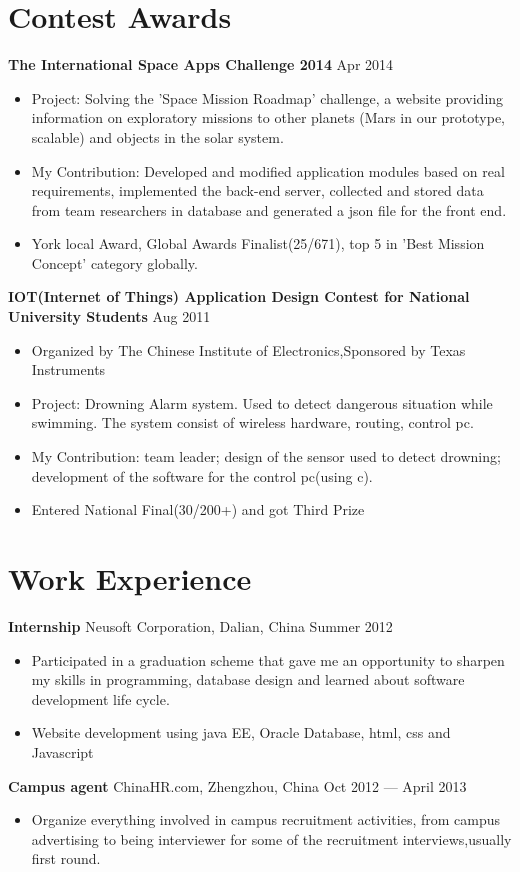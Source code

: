 \documentclass[margin]{res}
\begin{document}
\begin{resume}
\section{Contest Awards}   
{\bf The International Space Apps Challenge 2014}  \hfill Apr 2014
\begin{itemize} \itemsep -2pt
  \item Project: Solving the 'Space Mission Roadmap' challenge, a website
  providing information on exploratory missions to other planets (Mars in our
  prototype, scalable) and objects in the solar system.
  \item My Contribution: Developed and modified application modules based on
  real requirements, implemented the back-end server, collected and
  stored data from team researchers in database and generated a json file for
  the front end.
  \item York local Award, Global Awards Finalist(25/671), top 5 in 'Best Mission
  Concept' category globally.
\end{itemize}
{\bf IOT(Internet of Things) Application Design Contest for
National University Students} \hspace{\fill} Aug 2011\\  
\begin{itemize} \itemsep -2pt
  \item Organized by The
Chinese Institute of Electronics,Sponsored by Texas Instruments
   \item Project: Drowning Alarm system. Used to detect dangerous situation
   while swimming. The system consist of wireless hardware, routing, control pc.
   \item My Contribution: team leader; design of the sensor used to detect
   drowning; development of the software for the control pc(using c).
   \item Entered National Final(30/200+) and got Third Prize
 \end{itemize}  
\section{Work Experience}
 {\bf Internship } Neusoft Corporation, Dalian, China \hfill Summer  2012
 \begin{itemize} \itemsep -2pt  %
  \item Participated in a graduation scheme that gave me an opportunity to
  sharpen my skills in programming, database design and learned about software
  development life cycle.
 \item Website development using java EE, Oracle Database, html, css and
 Javascript
 \end{itemize}  
{\bf Campus agent} ChinaHR.com, Zhengzhou, China \hfill  Oct 2012 --- April 2013
\begin{itemize} \itemsep -2pt %
\item Organize everything involved in campus recruitment activities, from campus
advertising to being interviewer for some of the recruitment interviews,usually
first round.
\end{itemize}


\end{resume}
\end{document}
